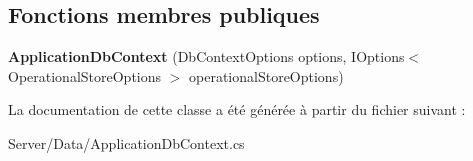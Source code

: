 \subsection*{Fonctions membres publiques}
\begin{DoxyCompactItemize}
\item 
\mbox{\label{class_mediwatch_website_1_1_server_1_1_data_1_1_application_db_context_a7bfe28d9e655a502f9995126239ed4d7}} 
{\bfseries Application\+Db\+Context} (Db\+Context\+Options options, I\+Options$<$ Operational\+Store\+Options $>$ operational\+Store\+Options)
\end{DoxyCompactItemize}


La documentation de cette classe a été générée à partir du fichier suivant \+:\begin{DoxyCompactItemize}
\item 
Server/\+Data/Application\+Db\+Context.\+cs\end{DoxyCompactItemize}
